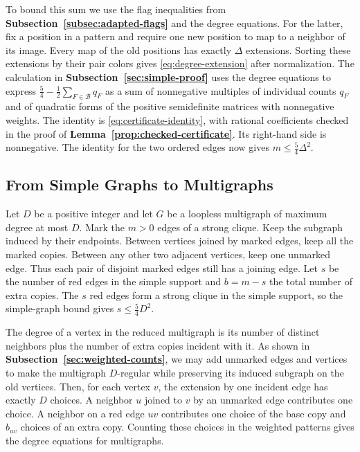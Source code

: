 \documentclass[preprint,11pt,numbers]{elsarticle-arxiv}
\numberwithin{equation}{section}
\theoremstyle{definition}
\begin{document}
To bound this sum we use the flag inequalities from
\textbf{Subsection~\ref{subsec:adapted-flags}} and the degree
equations. For the latter, fix a position in a pattern and require
one new position to map to a neighbor of its image. Every map of the
old positions has exactly $\Delta$ extensions. Sorting these
extensions by their pair colors gives \eqref{eq:degree-extension}
after normalization. The calculation in
\textbf{Subsection~\ref{sec:simple-proof}} uses the degree equations to
express $\frac{5}{4}-\frac{1}{2}\sum_{F\in\mathcal B}q_F$ as a sum
of nonnegative multiples of individual counts $q_F$ and of quadratic
forms of the positive semidefinite matrices with nonnegative weights. The identity is \eqref{eq:certificate-identity},
with rational coefficients checked in the proof of
\textbf{Lemma~\ref{prop:checked-certificate}}. Its right-hand side
is nonnegative. The identity for the two ordered edges now gives
$m\leq\frac{5}{4}\Delta^2$.

\subsection{From Simple Graphs to Multigraphs}\label{subsec:weighted-sketch}

Let $D$ be a positive integer and let $G$ be a loopless multigraph of
maximum degree at most $D$. Mark the $m>0$ edges of a strong clique.
Keep the subgraph induced by their endpoints. Between vertices joined
by marked edges, keep all the marked copies. Between any other two
adjacent vertices, keep one unmarked edge. Thus each pair of disjoint
marked edges still has a joining edge. Let $s$ be the number of red
edges in the simple support and $b=m-s$ the total number of extra
copies. The $s$ red edges form a strong clique in the simple support,
so the simple-graph bound gives $s\leq\frac{5}{4}D^2$.

The degree of a vertex in the reduced multigraph is its number of
distinct neighbors plus the number of extra copies incident with it.
As shown in \textbf{Subsection~\ref{sec:weighted-counts}}, we may add
unmarked edges and vertices to make the multigraph $D$-regular while
preserving its induced subgraph on the old vertices. Then, for each
vertex $v$, the extension by one incident edge has exactly $D$
choices. A neighbor $u$ joined to $v$ by an unmarked edge contributes
one choice. A neighbor on a red edge $uv$ contributes one choice of
the base copy and $b_{uv}$ choices of an extra copy. Counting these
choices in the weighted patterns gives the degree equations for
multigraphs.
\end{document}
